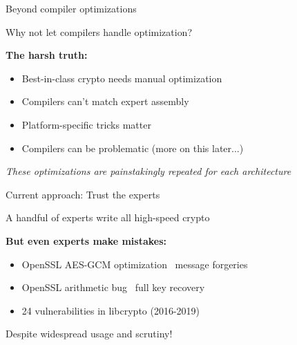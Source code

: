 \documentclass[aspectratio=169, lualatex, handout]{beamer}
\begin{document}
\begin{frame}{Beyond compiler optimizations}
	\begin{center}
		\Large
		Why not let compilers handle optimization?
	\end{center}
	\vspace{1em}
	\textbf{The harsh truth:}
	\begin{itemize}
		\item Best-in-class crypto needs manual optimization
		\item Compilers can't match expert assembly
		\item Platform-specific tricks matter
		\item Compilers can be problematic (more on this later...)
	\end{itemize}
	\vspace{0.5em}
	\begin{center}
		\textit{These optimizations are painstakingly repeated for each architecture}
	\end{center}
\end{frame}

\begin{frame}{Current approach: Trust the experts}
	\begin{center}
		\Large
		A handful of experts write all high-speed crypto
	\end{center}
	\vspace{1em}
	\textbf{But even experts make mistakes:}
	\begin{itemize}
		\item OpenSSL AES-GCM optimization \rightarrow\ message forgeries
		\item OpenSSL arithmetic bug \rightarrow\ full key recovery
		\item 24 vulnerabilities in libcrypto (2016-2019)
	\end{itemize}
	\vspace{0.5em}
	\begin{center}
		Despite widespread usage and scrutiny!
	\end{center}
\end{frame}
\end{document}
